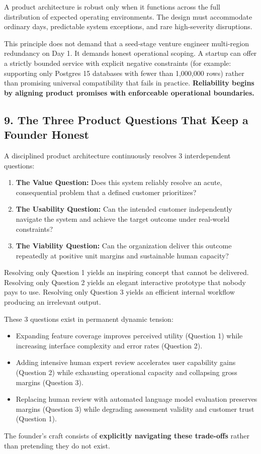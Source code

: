 A product architecture is robust only when it functions across the full distribution of expected operating environments. The design must accommodate ordinary days, predictable system exceptions, and rare high-severity disruptions.

This principle does not demand that a seed-stage venture engineer multi-region redundancy on Day 1. It demands honest operational scoping. A startup can offer a strictly bounded service with explicit negative constraints (for example: supporting only Postgres 15 databases with fewer than 1,000,000 rows) rather than promising universal compatibility that fails in practice. \textbf{Reliability begins by aligning product promises with enforceable operational boundaries.}

\subsection*{9. The Three Product Questions That Keep a Founder Honest}

A disciplined product architecture continuously resolves 3 interdependent questions:
\begin{enumerate}
    \item \textbf{The Value Question:} Does this system reliably resolve an acute, consequential problem that a defined customer prioritizes?
    \item \textbf{The Usability Question:} Can the intended customer independently navigate the system and achieve the target outcome under real-world constraints?
    \item \textbf{The Viability Question:} Can the organization deliver this outcome repeatedly at positive unit margins and sustainable human capacity?
\end{enumerate}

Resolving only Question 1 yields an inspiring concept that cannot be delivered. Resolving only Question 2 yields an elegant interactive prototype that nobody pays to use. Resolving only Question 3 yields an efficient internal workflow producing an irrelevant output.

These 3 questions exist in permanent dynamic tension:
\begin{itemize}
    \item Expanding feature coverage improves perceived utility (Question 1) while increasing interface complexity and error rates (Question 2).
    \item Adding intensive human expert review accelerates user capability gains (Question 2) while exhausting operational capacity and collapsing gross margins (Question 3).
    \item Replacing human review with automated language model evaluation preserves margins (Question 3) while degrading assessment validity and customer trust (Question 1).
\end{itemize}

The founder's craft consists of \textbf{explicitly navigating these trade-offs} rather than pretending they do not exist.
